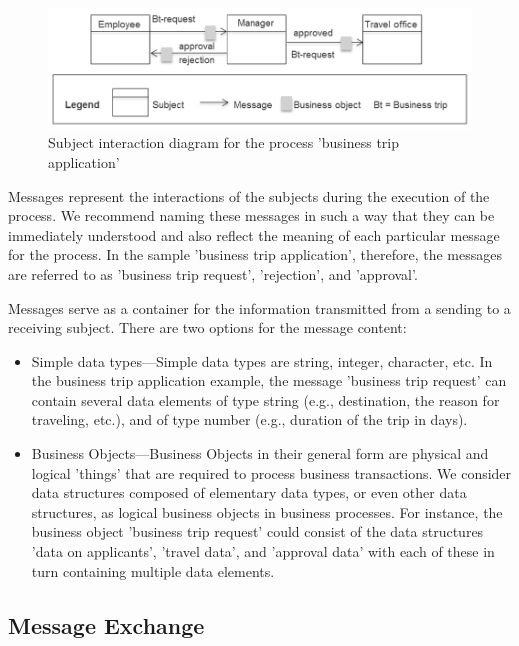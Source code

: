 \begin{figure}[htbp]
	\centering
	\includegraphics[width=14cm]{20181026-Ontologie-Bilder/Grafiken-Ontologie/SUbject-Interaction/Beispiel-Subject-Interaction}
	\caption[Subject interaction diagram]{Subject interaction diagram for the process 'business trip application'}
	\label{fig:beispiel-subject-interaction}
\end{figure}

Messages represent the interactions of the subjects during the execution of the process. We recommend naming these messages in such a way that they can be immediately understood and also reflect the meaning of each particular message for the process. In the sample 'business trip application', therefore, the messages are referred to as 'business trip request', 'rejection', and 'approval'.

Messages serve as a container for the information transmitted from a sending to a receiving subject. There are two options for the message content:

\begin{itemize}
	\item     Simple data types---Simple data types are string, integer, character, etc. In the business trip application example, the message 'business trip request' can contain several data elements of type string (e.g., destination, the reason for traveling, etc.), and of type number (e.g., duration of the trip in days).
	\item Business Objects---Business Objects in their general form are physical and logical 'things' that are required to process business transactions. We consider data structures composed of elementary data types, or even other data structures, as logical business objects in business processes. For instance, the business object 'business trip request' could consist of the data structures 'data on applicants', 'travel data', and 'approval data' with each of these in turn containing multiple data elements.
\end{itemize}

\subsection{Message Exchange}

